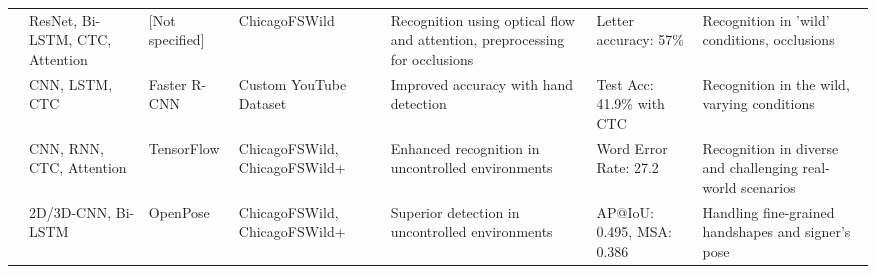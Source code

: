\begin{longtable}{p{}p{}p{}p{}p{}p{}p{}}
    \cite{kabadeAmericanSignLanguage2023}              & ResNet, Bi-LSTM, CTC, Attention                                                                                       & [Not specified]          & ChicagoFSWild                  & Recognition using optical flow and attention, preprocessing for occlusions                                                                                & Letter accuracy: 57\%                                  & Recognition in 'wild' conditions, occlusions                                                                                                                            \\

    \cite{shiAmericanSignLanguage2018}                 & CNN, LSTM, CTC                                                                                                        & Faster R-CNN             & Custom YouTube Dataset         & Improved accuracy with hand detection                                                                                                                     & Test Acc: 41.9\% with CTC                              & Recognition in the wild, varying conditions                                                                                                                             \\

    \cite{shiFingerspellingRecognitionWild2019}        & CNN, RNN, CTC, Attention                                                                                              & TensorFlow               & ChicagoFSWild, ChicagoFSWild+  & Enhanced recognition in uncontrolled environments                                                                                                         & Word Error Rate: 27.2                                  & Recognition in diverse and challenging real-world scenarios                                                                                                             \\

    \cite{shiFingerspellingDetectionAmerican2021}      & 2D/3D-CNN, Bi-LSTM                                                                                                    & OpenPose                 & ChicagoFSWild, ChicagoFSWild+  & Superior detection in uncontrolled environments                                                                                                           & AP@IoU: 0.495, MSA: 0.386                              & Handling fine-grained handshapes and signer’s pose                                                                                                                      \\


\end{longtable}
